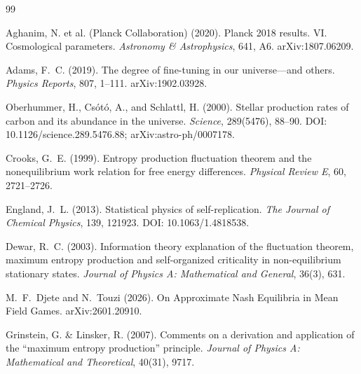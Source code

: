 \documentclass[12pt,a4paper]{article}
\theoremstyle{remark}
\begin{document}


{\small
\setlength{\parskip}{0pt}
\begin{thebibliography}{99}
\setlength{\itemsep}{0pt}

Aghanim, N. et al. (Planck Collaboration) (2020).
\newblock Planck 2018 results. VI. Cosmological parameters.
\newblock \textit{Astronomy \& Astrophysics}, 641, A6.
\newblock arXiv:1807.06209.

Adams, F.~C. (2019).
\newblock The degree of fine-tuning in our universe---and others.
\newblock \textit{Physics Reports}, 807, 1--111.
\newblock arXiv:1902.03928.

Oberhummer, H., Cs\'ot\'o, A., and Schlattl, H. (2000).
\newblock Stellar production rates of carbon and its abundance in the universe.
\newblock \textit{Science}, 289(5476), 88--90.
\newblock DOI: 10.1126/science.289.5476.88; arXiv:astro-ph/0007178.

Crooks, G.~E. (1999).
\newblock Entropy production fluctuation theorem and the nonequilibrium work relation for free energy differences.
\newblock \textit{Physical Review E}, 60, 2721--2726.

England, J.~L. (2013).
\newblock Statistical physics of self-replication.
\newblock \textit{The Journal of Chemical Physics}, 139, 121923.
\newblock DOI: 10.1063/1.4818538.

Dewar, R.~C. (2003).
\newblock Information theory explanation of the fluctuation theorem, maximum entropy production and self-organized criticality in non-equilibrium stationary states.
\newblock \textit{Journal of Physics A: Mathematical and General}, 36(3), 631.

M.~F.~Djete and N.~Touzi (2026).
\newblock On Approximate Nash Equilibria in Mean Field Games.
\newblock arXiv:2601.20910.

Grinstein, G. \& Linsker, R. (2007).
\newblock Comments on a derivation and application of the ``maximum entropy production'' principle.
\newblock \textit{Journal of Physics A: Mathematical and Theoretical}, 40(31), 9717.


\end{thebibliography}}
\end{document}
